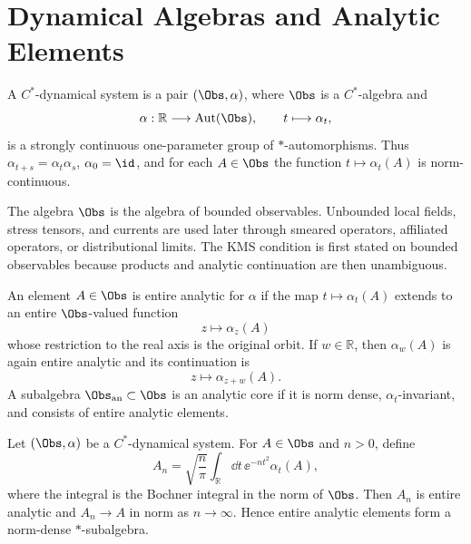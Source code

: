 \section{Dynamical Algebras and Analytic Elements}

\begin{definition}
\label{def:cstar-dynamical-system}
A \(C^\ast\)-dynamical system is a pair \((\Obs,\alpha)\), where \(\Obs\) is
a \(C^\ast\)-algebra and
\[
  \alpha:\mathbb R\longrightarrow \operatorname{Aut}(\Obs),
  \qquad t\longmapsto \alpha_t,
\]
is a strongly continuous one-parameter group of \(\ast\)-automorphisms.  Thus
\(\alpha_{t+s}=\alpha_t\alpha_s\), \(\alpha_0=\id\), and for each
\(A\in\Obs\) the function \(t\mapsto\alpha_t(A)\) is norm-continuous.
\end{definition}

The algebra \(\Obs\) is the algebra of bounded observables.  Unbounded local
fields, stress tensors, and currents are used later through smeared
operators, affiliated operators, or distributional limits.  The KMS condition
is first stated on bounded observables because products and analytic
continuation are then unambiguous.

\begin{definition}
\label{def:kms-analytic-element}
An element \(A\in\Obs\) is entire analytic for \(\alpha\) if the map
\(t\mapsto\alpha_t(A)\) extends to an entire \(\Obs\)-valued function
\[
  z\longmapsto\alpha_z(A)
\]
whose restriction to the real axis is the original orbit.  If \(w\in\mathbb R\),
then \(\alpha_w(A)\) is again entire analytic and its continuation is
\[
  z\longmapsto \alpha_{z+w}(A).
\]
A subalgebra \(\Obs_{\rm an}\subset\Obs\) is an analytic core if it is norm
dense, \(\alpha_t\)-invariant, and consists of entire analytic elements.
\end{definition}

\begin{lemma}
\label{lem:kms-gaussian-analytic-elements}
Let \((\Obs,\alpha)\) be a \(C^\ast\)-dynamical system.  For
\(A\in\Obs\) and \(n>0\), define
\begin{equation}
  A_n
  =
  \sqrt{\frac{n}{\pi}}
  \int_{\mathbb R}\dd t\,\ee^{-nt^2}\alpha_t(A),
  \label{eq:kms-gaussian-analytic-smearing}
\end{equation}
where the integral is the Bochner integral in the norm of \(\Obs\).  Then
\(A_n\) is entire analytic and \(A_n\to A\) in norm as \(n\to\infty\).  Hence
entire analytic elements form a norm-dense \(\ast\)-subalgebra.
\end{lemma}

